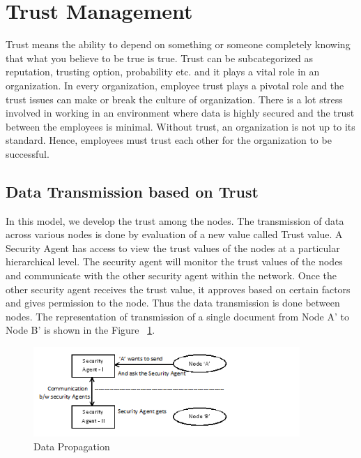 \section{Trust Management}
\label{sec:trust-management}
Trust means the ability to depend on something or someone completely knowing that what you
believe to be true is true. Trust can be subcategorized as reputation, trusting option, probability
etc.\autocite{Liu2006} and it plays a vital role in an organization. In every organization, employee trust plays
a pivotal role and the trust issues can make or break the culture of organization. There is a
lot stress involved in working in an environment where data is highly secured and the trust
between the employees is minimal. Without trust, an organization is not up to its standard.
Hence, employees must trust each other for the organization to be successful.


\subsection{Data Transmission based on Trust}
In this model, we develop the trust among the nodes. The transmission of data across various
nodes is done by evaluation of a new value called Trust value. A Security Agent has access
to view the trust values of the nodes at a particular hierarchical level. The security agent will
monitor the trust values of the nodes and communicate with the other security agent within
the network. Once the other security agent receives the trust value, it approves based on
certain factors and gives permission to the node. Thus the data transmission is done between
nodes. The representation of transmission of a single document from Node A' to Node B' is
shown in the Figure ~\ref{fig:DataTransmission}.
\begin{figure}[h!]
    \begin{center}
        \includegraphics[width=0.90\textwidth]{Figures/figure1.png}
        \caption{Data Propagation}
        \label{fig:DataTransmission}
    \end{center}
\end{figure}


